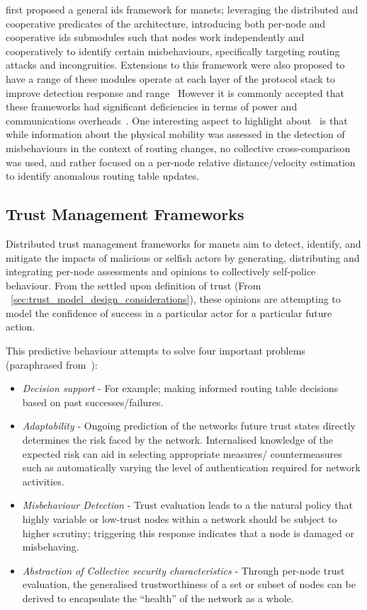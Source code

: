 \citet{zhang2003intrusion} first proposed a general \gls{ids} framework for \glspl{manet}; leveraging the distributed and cooperative predicates of the architecture, introducing both per-node and cooperative \gls{ids} submodules such that nodes work independently and cooperatively to identify certain misbehaviours, specifically targeting routing attacks and incongruities.
Extensions to this framework were also proposed to have a range of these modules operate at each layer of the protocol stack to improve detection response and range~\cite{Parker2006}
However it is commonly accepted that these frameworks had significant deficiencies in terms of power and communications overheads~\cite{csen2010security,Ryu2008}.
One interesting aspect to highlight about~\citet{zhang2003intrusion} is that while information about the physical mobility was assessed in the detection of misbehaviours in the context of routing changes, no collective cross-comparison was used, and rather focused on a per-node relative distance/velocity estimation to identify anomalous routing table updates.

\subsection{Trust Management Frameworks}\label{sec:tmfs}

Distributed trust management frameworks for \glspl{manet} aim to detect, identify, and mitigate the impacts of malicious or selfish actors by generating, distributing and integrating per-node assessments and opinions to collectively self-police behaviour.
From the settled upon definition of trust (From ~\autoref{sec:trust_model_design_considerations}), these opinions are attempting to model the confidence of success in a particular actor for a particular future action.

This predictive behaviour attempts to solve four important problems (paraphrased from~\cite{Sun2008}):
\begin{itemize}
  \item \emph{Decision support} - For example; making informed routing table decisions based on past successes/failures.
  \item \emph{Adaptability} - Ongoing prediction of the networks future trust states directly determines the risk faced by the network. Internalised knowledge of the expected risk can aid in selecting appropriate measures/ countermeasures such as automatically varying the level of authentication required for network activities.
  \item \emph{Misbehaviour Detection} - Trust evaluation leads to a the natural policy that highly variable or low-trust nodes within a network should be subject to higher scrutiny; triggering this response indicates that a node is damaged or misbehaving.
  \item \emph{Abstraction of Collective security characteristics} - Through per-node trust evaluation, the generalised trustworthiness of a set or subset of nodes can be derived to encapsulate the ``health'' of the network as a whole.
\end{itemize}

